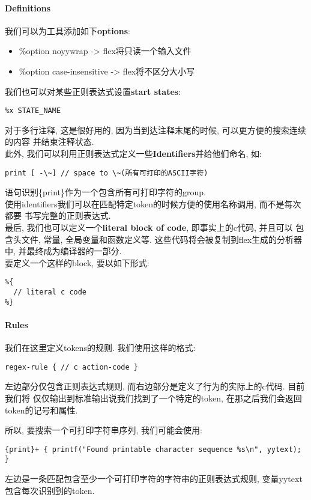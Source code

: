 \paragraph{Definitions}
我们可以为工具添加如下\textbf{options}:
\begin{itemize}
  \item \%option noyywrap -> flex将只读一个输入文件
  \item \%option case-insensitive -> flex将不区分大小写
\end{itemize}
我们也可以对某些正则表达式设置\textbf{start states}: \\
\begin{lstlisting}
%x STATE_NAME
\end{lstlisting}
对于多行注释, 这是很好用的, 因为当到达注释末尾的时候, 可以更方便的搜索连续的内容
并结束注释状态. \\
此外, 我们可以利用正则表达式定义一些\textbf{Identifiers}并给他们命名, 如: \\
\begin{lstlisting}
print [ -\~] // space to \~(所有可打印的ASCII字符)
\end{lstlisting}
语句识别\{print\}作为一个包含所有可打印字符的group. \\
使用identifiers我们可以在匹配特定token的时候方便的使用名称调用, 而不是每次都要
书写完整的正则表达式. \\
最后, 我们也可以定义一个\textbf{literal block of code}, 即事实上的c代码, 并且可以
包含头文件, 常量, 全局变量和函数定义等. 这些代码将会被复制到flex生成的分析器中, 
并最终成为编译器的一部分. \\
要定义一个这样的block, 要以如下形式:
\begin{lstlisting}
%{
  // literal c code
%}
\end{lstlisting}

\paragraph{Rules}
我们在这里定义tokens的规则.
我们使用这样的格式: \\
\begin{lstlisting}
regex-rule { // c action-code }
\end{lstlisting}
左边部分仅包含正则表达式规则, 而右边部分是定义了行为的实际上的c代码. 目前我们将
仅仅输出到标准输出说我们找到了一个特定的token, 在那之后我们会返回token的记号和属性.

所以, 要搜索一个可打印字符串序列, 我们可能会使用: \\
\begin{lstlisting}
{print}+ { printf("Found printable character sequence %s\n", yytext); }
\end{lstlisting}
左边是一条匹配包含至少一个可打印字符的字符串的正则表达式规则, 变量yytext
包含每次识别到的token.


